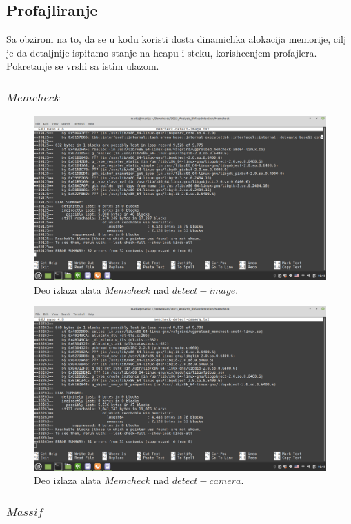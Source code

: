 \documentclass{article}
\begin{document}
\subsection{Profajliranje}
Sa obzirom na to, da se u kodu koristi dosta dinamichka alokacija memorije, cilj je da detaljnije ispitamo stanje na heapu i steku, korishcenjem profajlera. Pokretanje se vrshi sa istim ulazom.
\subsubsection{$Memcheck$}
\begin{figure}[H]
    \centering
    \includegraphics[width=12cm]{img/memcheck/memcheck-detect-image.png}
    \caption{Deo izlaza alata $Memcheck$ nad $detect-image.$}
    \label{di:mcheck}
\end{figure}

\begin{figure}[H]
    \centering
    \includegraphics[width=12cm]{img/memcheck/memcheck_detect_camera.png}
    \caption{Deo izlaza alata $Memcheck$ nad $detect-camera.$}
    \label{dc:mcheck}
\end{figure}
\subsubsection{$Massif$}
\end{document}
